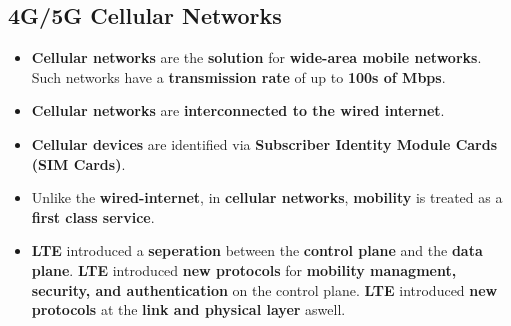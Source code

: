 \documentclass{article}
\begin{document}
    \subsection*{4G/5G Cellular Networks}
    \begin{itemize}
        \item \textbf{Cellular networks} are the \textbf{solution} for \textbf{wide-area mobile networks}. Such networks have a \textbf{transmission rate} of up to \textbf{100s of Mbps}.
        \item \textbf{Cellular networks} are \textbf{interconnected to the wired internet}.
        \item \textbf{Cellular devices} are identified via \textbf{Subscriber Identity Module Cards (SIM Cards)}.
        \item Unlike the \textbf{wired-internet}, in \textbf{cellular networks}, \textbf{mobility} is treated as a \textbf{first class service}.
        \item \textbf{LTE} introduced a \textbf{seperation} between the \textbf{control plane} and the \textbf{data plane}. \textbf{LTE} introduced \textbf{new protocols} for \textbf{mobility managment, security, and authentication} on the control plane. \textbf{LTE} introduced \textbf{new protocols} at the \textbf{link and physical layer} aswell.
    \end{itemize}
\end{document}
